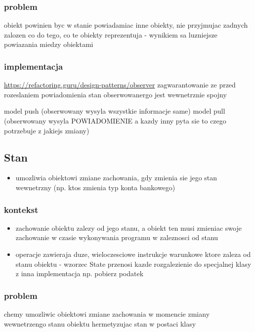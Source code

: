 \documentclass[11pt]{article}
\begin{document}
\subsubsection{problem}
\label{sec:org041c0c7}
obiekt powinien byc w stanie powiadamiac inne obiekty, nie przyjmujac zadnych zalozen co do tego, co te obiekty reprezentuja - wynikiem sa luzniejsze powiazania miedzy obiektami
\subsubsection{implementacja}
\label{sec:orgaabf340}
\url{https://refactoring.guru/design-patterns/observer}
zagwarantowanie ze przed rozeslaniem powiadomienia stan obserwowanergo jest wewnetrznie spojny


model push (obserwowany wysyla wszystkie informacje same)
model pull (obserwowany wysyla POWIADOMIENIE a kazdy inny pyta sie to czego potrzebuje z jakiejs zmiany)
\subsection{Stan}
\label{sec:org26a7210}
\begin{itemize}
\item umozliwia obiektowi zmiane zachowania, gdy zmienia sie jego stan wewnetrzny (np. ktos zmienia typ konta bankowego)
\end{itemize}
\subsubsection{kontekst}
\label{sec:org037bf63}
\begin{itemize}
\item zachowanie obiektu zalezy od jego stanu, a obiekt ten musi zmieniac swoje zachowanie w czasie wykonywania programu w zaleznosci od stanu
\item operacje zawieraja duze, wieloczesciowe instrukcje warunkowe ktore zaleza od stanu obiektu - wzorzec State przenosi kazde rozgalezienie do specjalnej klasy z inna implementacja np. pobierz podatek
\end{itemize}
\subsubsection{problem}
\label{sec:org0787654}
chemy umozliwic obiektowi zmiane zachowania w momencie zmiany wewnetrzengo stanu obiektu hermetyzujac stan w postaci klasy
\end{document}
